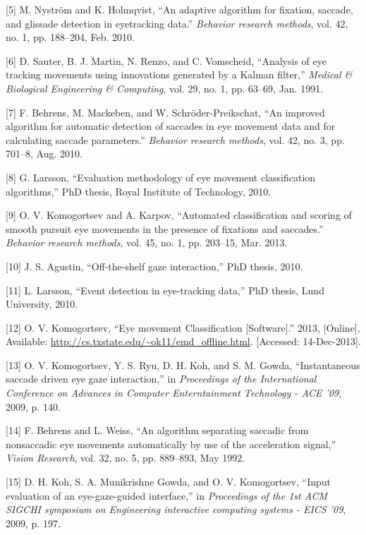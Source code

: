 \documentclass[brazil,]{report}
\begin{document}
{[}5{]} M. Nyström and K. Holmqvist, ``An adaptive algorithm for
fixation, saccade, and glissade detection in eyetracking data.''
\emph{Behavior research methods}, vol. 42, no. 1, pp. 188--204, Feb.
2010.

{[}6{]} D. Sauter, B. J. Martin, N. Renzo, and C. Vomscheid, ``Analysis
of eye tracking movements using innovations generated by a Kalman
filter,'' \emph{Medical \& Biological Engineering \& Computing}, vol.
29, no. 1, pp. 63--69, Jan. 1991.

{[}7{]} F. Behrens, M. Mackeben, and W. Schröder-Preikschat, ``An
improved algorithm for automatic detection of saccades in eye movement
data and for calculating saccade parameters.'' \emph{Behavior research
methods}, vol. 42, no. 3, pp. 701--8, Aug. 2010.

{[}8{]} G. Larsson, ``Evaluation methodology of eye movement
classification algorithms,'' PhD thesis, Royal Institute of Technology,
2010.

{[}9{]} O. V. Komogortsev and A. Karpov, ``Automated classification and
scoring of smooth pursuit eye movements in the presence of fixations and
saccades.'' \emph{Behavior research methods}, vol. 45, no. 1, pp.
203--15, Mar. 2013.

{[}10{]} J. S. Agustin, ``Off-the-shelf gaze interaction,'' PhD thesis,
2010.

{[}11{]} L. Larsson, ``Event detection in eye-tracking data,'' PhD
thesis, Lund University, 2010.

{[}12{]} O. V. Komogortsev, ``Eye movement Classification
{[}Software{]}.'' 2013, {[}Online{]}, Available:
\url{http://cs.txstate.edu/~ok11/emd_offline.html}. {[}Accessed:
14-Dec-2013{]}.

{[}13{]} O. V. Komogortsev, Y. S. Ryu, D. H. Koh, and S. M. Gowda,
``Instantaneous saccade driven eye gaze interaction,'' in
\emph{Proceedings of the International Conference on Advances in
Computer Enterntainment Technology - ACE '09}, 2009, p. 140.

{[}14{]} F. Behrens and L. Weiss, ``An algorithm separating saccadic
from nonsaccadic eye movements automatically by use of the acceleration
signal,'' \emph{Vision Research}, vol. 32, no. 5, pp. 889--893, May
1992.

{[}15{]} D. H. Koh, S. A. Munikrishne Gowda, and O. V. Komogortsev,
``Input evaluation of an eye-gaze-guided interface,'' in
\emph{Proceedings of the 1st ACM SIGCHI symposium on Engineering
interactive computing systems - EICS '09}, 2009, p. 197.
\end{document}
